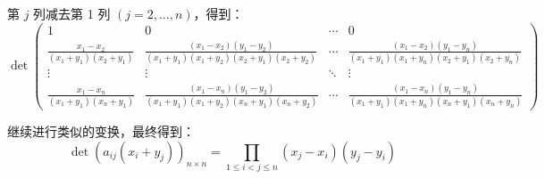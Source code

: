 \documentclass[a4paper,12pt]{article}
\begin{document}
\begin{enumerate}[leftmargin=*]
第 $j$ 列减去第 1 列 $(j=2,\ldots,n)$，得到：
\[
\det\begin{pmatrix}
1 & 0 & \cdots & 0 \\
\frac{x_1-x_2}{(x_1+y_1)(x_2+y_1)} & \frac{(x_1-x_2)(y_1-y_2)}{(x_1+y_1)(x_1+y_2)(x_2+y_1)(x_2+y_2)} & \cdots & \frac{(x_1-x_2)(y_1-y_n)}{(x_1+y_1)(x_1+y_n)(x_2+y_1)(x_2+y_n)} \\
\vdots & \vdots & \ddots & \vdots \\
\frac{x_1-x_n}{(x_1+y_1)(x_n+y_1)} & \frac{(x_1-x_n)(y_1-y_2)}{(x_1+y_1)(x_1+y_2)(x_n+y_1)(x_n+y_2)} & \cdots & \frac{(x_1-x_n)(y_1-y_n)}{(x_1+y_1)(x_1+y_n)(x_n+y_1)(x_n+y_n)}
\end{pmatrix}
\]

继续进行类似的变换，最终得到：
\[
\det(a_{ij}(x_i+y_j))_{n\times n} = \prod_{1\leq i<j\leq n}(x_j-x_i)(y_j-y_i)
\]

\end{enumerate}
\end{document}
